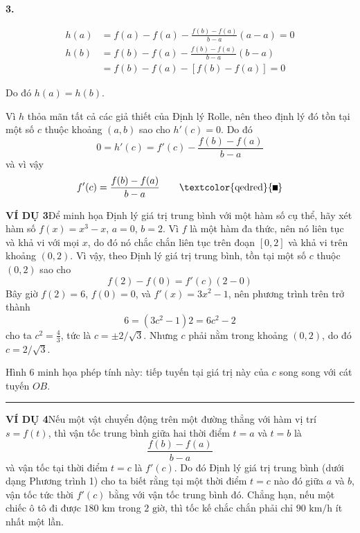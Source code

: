 \begin{minipage}[t]{0.68\textwidth}
  \vspace{0pt}
  \noindent
  \textbf{3.}\hspace{1.5em}
  \begin{minipage}[t]{0.88\linewidth}
    \vspace{-1.2em}
    \begin{align*}
      h(a) &= f(a) - f(a) - \frac{f(b) - f(a)}{b - a}(a - a) = 0\\[6pt]
      h(b) &= f(b) - f(a) - \frac{f(b) - f(a)}{b - a}(b - a)\\[3pt]
           &= f(b) - f(a) - [f(b) - f(a)] = 0
    \end{align*}
  \end{minipage}

  \vspace{6pt}
  \noindent
  Do đó $h(a) = h(b)$.

  \vspace{6pt}
  \noindent
  Vì $h$ thỏa mãn tất cả các giả thiết của Định lý Rolle, nên theo định lý đó tồn tại một số $c$ thuộc khoảng $(a, b)$ sao cho $h'(c) = 0$. Do đó
  \[
  0 = h'(c) = f'(c) - \frac{f(b) - f(a)}{b - a}
  \]
  và vì vậy
  \[
  f'(c) = \frac{f(b) - f(a)}{b - a} \tag*{\textcolor{qedred}{\rule{1.2ex}{1.2ex}}}
  \]

  \vspace{14pt}
  \noindent
  {\color{stewartblue}\textsf{\textbf{VÍ DỤ 3}}}\hspace{0.8em}Để minh họa Định lý giá trị trung bình với một hàm số cụ thể, hãy xét hàm số $f(x) = x^3 - x$, $a = 0$, $b = 2$. Vì $f$ là một hàm đa thức, nên nó liên tục và khả vi với mọi $x$, do đó nó chắc chắn liên tục trên đoạn $[0, 2]$ và khả vi trên khoảng $(0, 2)$. Vì vậy, theo Định lý giá trị trung bình, tồn tại một số $c$ thuộc $(0, 2)$ sao cho
  \[
  f(2) - f(0) = f'(c)(2 - 0)
  \]
  Bây giờ $f(2) = 6$, $f(0) = 0$, và $f'(x) = 3x^2 - 1$, nên phương trình trên trở thành
  \[
  6 = (3c^2 - 1)2 = 6c^2 - 2
  \]
  cho ta $c^2 = \frac{4}{3}$, tức là $c = \pm 2/\sqrt{3}$. Nhưng $c$ phải nằm trong khoảng $(0, 2)$, do đó $c = 2/\sqrt{3}$.

  \vspace{6pt}
  \noindent
  Hình 6 minh họa phép tính này: tiếp tuyến tại giá trị này của $c$ song song với cát tuyến $OB$.\hfill\textcolor{stewartblue}{\rule{1.1ex}{1.1ex}}

  \vspace{14pt}
  \noindent
  {\color{stewartblue}\textsf{\textbf{VÍ DỤ 4}}}\hspace{0.8em}Nếu một vật chuyển động trên một đường thẳng với hàm vị trí $s = f(t)$, thì vận tốc trung bình giữa hai thời điểm $t = a$ và $t = b$ là
  \[
  \frac{f(b) - f(a)}{b - a}
  \]
  và vận tốc tại thời điểm $t = c$ là $f'(c)$. Do đó Định lý giá trị trung bình (dưới dạng Phương trình 1) cho ta biết rằng tại một thời điểm $t = c$ nào đó giữa $a$ và $b$, vận tốc tức thời $f'(c)$ bằng với vận tốc trung bình đó. Chẳng hạn, nếu một chiếc ô tô đi được $180\text{ km}$ trong $2\text{ giờ}$, thì tốc kế chắc chắn phải chỉ $90\text{ km/h}$ ít nhất một lần.


\end{minipage}
